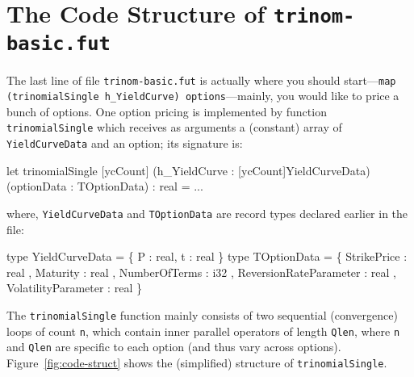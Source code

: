 \documentclass[a4paper,11pt]{article}
\begin{document}
\section{The Code Structure of {\tt trinom-basic.fut}}

The last line of file {\tt trinom-basic.fut} is actually where you should
start---{\tt map (trinomialSingle h\_YieldCurve) options}---mainly, you 
would like to price a bunch of options. One option pricing is implemented
by function {\tt trinomialSingle} which receives as arguments a
(constant) array of {\tt YieldCurveData} and an option; its signature is:  
%
\begin{fancycode}
let trinomialSingle [ycCount] (h_YieldCurve : [ycCount]YieldCurveData)
                              (optionData   : TOptionData)
                            : real = ...
\end{fancycode}
\noindent where, {\tt YieldCurveData} and {\tt TOptionData} are record types
declared earlier in the file:
%
\begin{fancycode}
type YieldCurveData = \{ P : real, t : real \}
type TOptionData = \{
    StrikePrice   : real  
  , Maturity      : real  
  , NumberOfTerms : i32   
  , ReversionRateParameter : real 
  , VolatilityParameter    : real
\}
\end{fancycode}

The {\tt trinomialSingle} function mainly consists of two sequential 
(convergence) loops of count {\tt n}, which contain inner parallel
operators of length {\tt Qlen}, where {\tt n} and {\tt Qlen} are specific
to each option (and thus vary across options).   Figure~\ref{fig:code-struct} 
shows the (simplified) structure of {\tt trinomialSingle}.
\end{document}

